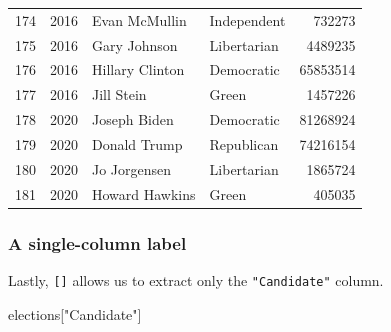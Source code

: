 \documentclass[
  letterpaper,
  DIV=11,
  numbers=noendperiod]{scrreprt}
\newenvironment{Shaded}{\begin{snugshade}}{\end{snugshade}}
\newcommand{\NormalTok}[1]{\textcolor[rgb]{0.00,0.23,0.31}{#1}}
\newcommand{\StringTok}[1]{\textcolor[rgb]{0.13,0.47,0.30}{#1}}
\begin{document}
\begin{tabular}{lrllr}
174 &  2016 &           Evan McMullin &            Independent &        732273 \\
175 &  2016 &            Gary Johnson &            Libertarian &       4489235 \\
176 &  2016 &         Hillary Clinton &             Democratic &      65853514 \\
177 &  2016 &              Jill Stein &                  Green &       1457226 \\
178 &  2020 &            Joseph Biden &             Democratic &      81268924 \\
179 &  2020 &            Donald Trump &             Republican &      74216154 \\
180 &  2020 &            Jo Jorgensen &            Libertarian &       1865724 \\
181 &  2020 &          Howard Hawkins &                  Green &        405035 \\
\bottomrule
\end{tabular}

\hypertarget{a-single-column-label}{%
\subsubsection{A single-column label}\label{a-single-column-label}}

Lastly, \texttt{{[}{]}} allows us to extract only the
\texttt{"Candidate"} column.

\begin{Shaded}
\begin{Highlighting}[]
\NormalTok{elections[}\StringTok{"Candidate"}\NormalTok{]}
\end{Highlighting}
\end{Shaded}
\end{document}
